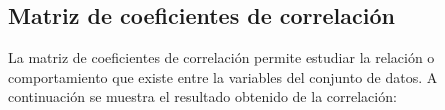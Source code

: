 \documentclass[conference]{IEEEtran}\usepackage[]{graphicx}\usepackage[]{color}
\begin{document}
	
	
\vspace{-6mm}
\subsection{Matriz de coeficientes de correlación}
La matriz de coeficientes de correlación permite estudiar la relación o comportamiento que existe entre la variables del conjunto de datos. A continuación se muestra el resultado obtenido de la correlación: 
\end{document}
